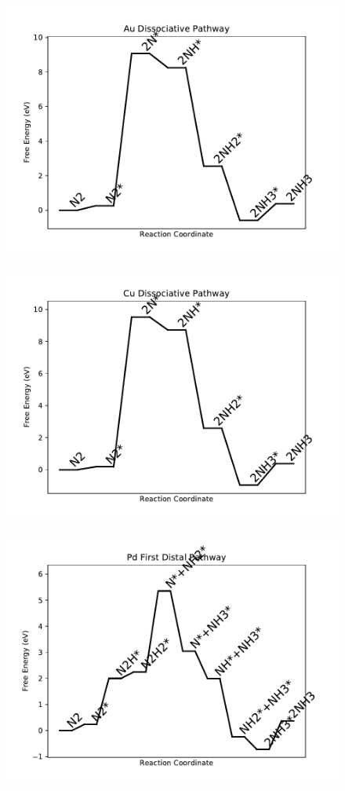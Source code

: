 \begin{figure}
\centering
\includegraphics[width=0.8\linewidth]{data/plots/Au_dissociative.pdf}
\end{figure}

\begin{figure}
\centering
\includegraphics[width=0.8\linewidth]{data/plots/Cu_dissociative.pdf}
\end{figure}

\begin{figure}
\centering
\includegraphics[width=0.8\linewidth]{data/plots/Pd_distal_1.pdf}
\end{figure}

